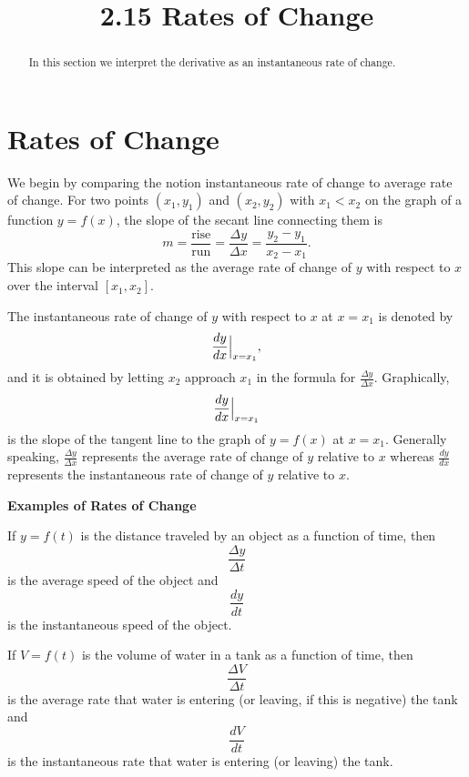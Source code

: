 \documentclass{ximera}
\title{2.15 Rates of Change}
\begin{document}
\begin{abstract}
In this section we interpret the derivative as an instantaneous rate of change.
\end{abstract}

\maketitle

\section{Rates of Change}

We begin by comparing the notion instantaneous rate of change to average rate of change. 
For two points $(x_1, y_1)$ and $(x_2, y_2)$ with $x_1 < x_2$ on the graph of a function
$y = f(x)$, the slope of the secant line connecting them is 
\[m = \frac{\text{rise}}{\text{run}} = \frac{\Delta y}{\Delta x} = \frac{y_2 - y_1}{x_2 - x_1}.\]
This slope can be interpreted as the average rate of change of $y$ with respect to $x$ over the interval $[x_1, x_2]$.

The instantaneous rate of change of $y$ with respect to $x$ at $x = x_1$ is denoted by
\[\frac{dy}{dx}\Big{|}_{x=x_1},\]
and it is obtained by letting $x_2$ approach $x_1$ in the formula for $\frac{\Delta y}{\Delta x}.$
Graphically, 
\[\frac{dy}{dx}\Big{|}_{x=x_1}\]
is the slope of the tangent line to the graph of $y = f(x)$ at $x=x_1$.
Generally speaking, $\frac{\Delta y}{\Delta x}$
represents the average rate of change of $y$ relative to $x$ whereas
$\frac{dy}{dx}$
represents the instantaneous rate of change of $y$ relative to $x$.


\begin{center}
\bf{Examples of Rates of Change}
\end{center}
 
\begin{example}[example 1]

If $y = f(t)$ is the distance traveled by an object as a function of time, then 
\[\frac{\Delta y}{\Delta t}\]
is the average speed of the object and
\[\frac{dy}{dt}\]
is the instantaneous speed of the object.
\end{example}

\begin{example} If $V = f(t)$ is the volume of water in a tank as a function of time, then 
\[\frac{\Delta V}{\Delta t}\]
is the average rate that water is entering (or leaving, if this is negative) the tank and
\[\frac{dV}{dt}\]
is the instantaneous rate that water is entering (or leaving) the tank.
 \end{example}
\end{document}
